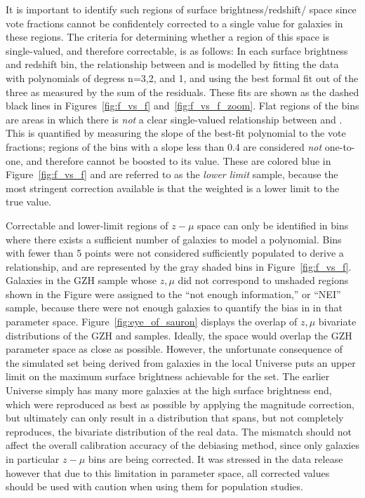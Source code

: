 It is important to identify such regions of surface brightness/redshift/\ffeatures{} space since vote fractions cannot be confidentely corrected to a single value for galaxies in these regions. The criteria for determining whether a region of this space is single-valued, and therefore correctable, is as follows: In each surface brightness and redshift bin, the relationship between \ffeaturesz{} and \ffeaturesrest{} is modelled by fitting the data with polynomials of degress n=3,2, and 1, and using the best formal fit out of the three as measured by the sum of the residuals. These fits are shown as the dashed black lines in Figures~\ref{fig:f_vs_f} and~\ref{fig:f_vs_f_zoom}. Flat regions of the bins are areas in which there is \emph{not} a clear single-valued relationship between \ffeaturesz{} and \ffeaturesrest{}. This is quantified by measuring the slope of the best-fit polynomial to the vote fractions; regions of the bins with a slope less than 0.4 are considered \emph{not} one-to-one, and therefore \ffeaturesz{} cannot be boosted to its \ffeaturesrest{} value. These are colored blue in Figure~\ref{fig:f_vs_f} and are referred to as the \textit{lower limit} sample, because the most stringent correction available is that the weighted \ffeatures{} is a lower limit to the true value.

Correctable and lower-limit regions of $z-\mu$ space can only be identified in bins where there exists a sufficient number of \ferengi{} galaxies to model a polynomial. Bins with fewer than 5 points were not considered sufficiently populated to derive a relationship, and are represented by the gray shaded bins in Figure~\ref{fig:f_vs_f}. Galaxies in the GZH sample whose $z,\mu$ did not correspond to unshaded regions shown in the Figure were assigned to the ``not enough information,'' or ``NEI'' sample, because there were not enough \ferengi{} galaxies to quantify the bias in \ffeatures{} in that parameter space. Figure~\ref{fig:eye_of_sauron} displays the overlap of $z,\mu$ bivariate distributions of the GZH and \ferengi{} samples. Ideally, the \ferengi{} space would overlap the GZH parameter space as close as possible. However, the unfortunate consequence of the simulated set being derived from galaxies in the local Universe puts an upper limit on the maximum surface brightness achievable for the \ferengi{} set. The earlier Universe simply has many more galaxies at the high surface brightness end, which were reproduced as best as possible by applying the magnitude correction, but ultimately can only result in a distribution that spans, but not completely reproduces, the bivariate distribution of the real data. The mismatch should not affect the overall calibration accuracy of the debiasing method, since only galaxies in particular $z-\mu$ bins are being corrected. It was stressed in the data release \citep{Willett2016} however that due to this limitation in parameter space, all corrected values should be used with caution when using them for population studies.  

